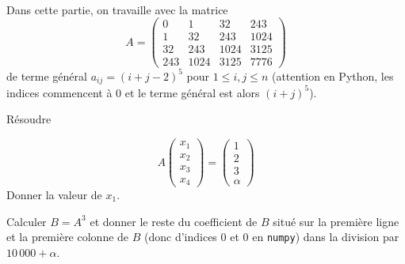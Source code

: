 \exer{[SYS-007]}
\setcounter{numques}{0}~\\


Dans cette partie, on travaille avec la matrice
\begin{equation*}
A=  \begin{pmatrix}
  0 & 1 & 32 & 243\\
  1 & 32 & 243 & 1024\\
  32 & 243 & 1024 & 3125\\
  243 & 1024 & 3125 & 7776
  \end{pmatrix}
\end{equation*}
de terme général $a_{ij}=(i+j-2)^{5}$ pour $1\leq i,j\leq n$
(attention en Python, les indices commencent à $0$ et le terme général
est alors $(i+j)^{5}$).


\question{} Résoudre

  \begin{equation*}
    A
    \begin{pmatrix}
      x_{1}\\x_{2}\\x_{3}\\x_{4}
    \end{pmatrix}
    =
    \begin{pmatrix}
      1\\ 2\\ 3\\ \alpha
    \end{pmatrix}
  \end{equation*}
  Donner la valeur de $x_{1}$.
  
  
  


\question{}
  Calculer $B = A^{3}$ et donner le reste du coefficient de $B$ situé
  sur la première ligne et la première colonne de $B$ (donc d'indices
  $0$ et $0$ en \texttt{numpy}) dans la division par $10\,000+\alpha$.


